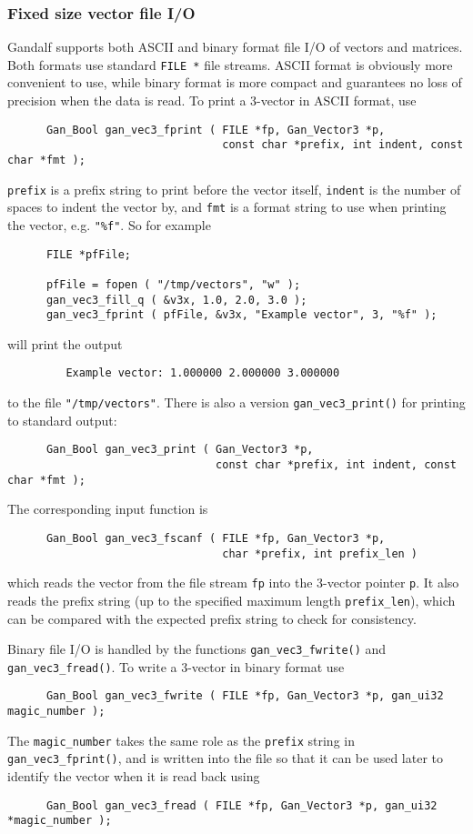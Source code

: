\subsubsection{Fixed size vector file I/O}
Gandalf supports both ASCII and binary format file I/O of vectors and
matrices. Both formats use standard {\tt FILE~*} file streams.
ASCII format is obviously more convenient to use, while binary format is
more compact and guarantees no loss of precision when the data is read.
To print a 3-vector in ASCII format, use
\begin{verbatim}
      Gan_Bool gan_vec3_fprint ( FILE *fp, Gan_Vector3 *p,
                                 const char *prefix, int indent, const char *fmt );
\end{verbatim}
{\tt prefix} is a prefix string to print before the vector itself, {\tt indent}
is the number of spaces to indent the vector by, and {\tt fmt} is a format
string to use when printing the vector, e.g. {\tt "\%f"}. So for example
\begin{verbatim}
      FILE *pfFile;

      pfFile = fopen ( "/tmp/vectors", "w" );
      gan_vec3_fill_q ( &v3x, 1.0, 2.0, 3.0 );
      gan_vec3_fprint ( pfFile, &v3x, "Example vector", 3, "%f" );
\end{verbatim}
will print the output
\begin{verbatim}
         Example vector: 1.000000 2.000000 3.000000
\end{verbatim}
to the file {\tt "/tmp/vectors"}.
There is also a version {\tt gan\_vec3\_print()} for printing to
standard output:
\begin{verbatim}
      Gan_Bool gan_vec3_print ( Gan_Vector3 *p,
                                const char *prefix, int indent, const char *fmt );
\end{verbatim}
The corresponding input function is
\begin{verbatim}
      Gan_Bool gan_vec3_fscanf ( FILE *fp, Gan_Vector3 *p,
                                 char *prefix, int prefix_len )
\end{verbatim}
which reads the vector from the file stream {\tt fp} into the 3-vector
pointer {\tt p}. It also reads the prefix string (up to the specified maximum
length {\tt prefix\_len}), which can be compared with the expected prefix
string to check for consistency.

Binary file I/O is handled by the functions {\tt gan\_vec3\_fwrite()}
and {\tt gan\_vec3\_fread()}. To write a 3-vector in binary format use
\begin{verbatim}
      Gan_Bool gan_vec3_fwrite ( FILE *fp, Gan_Vector3 *p, gan_ui32 magic_number );
\end{verbatim}
The {\tt magic\_number} takes the same role as the {\tt prefix} string
in {\tt gan\_vec3\_fprint()}, and is written into the file so that it can be
used later to identify the vector when it is read back using
\begin{verbatim}
      Gan_Bool gan_vec3_fread ( FILE *fp, Gan_Vector3 *p, gan_ui32 *magic_number );
\end{verbatim}

